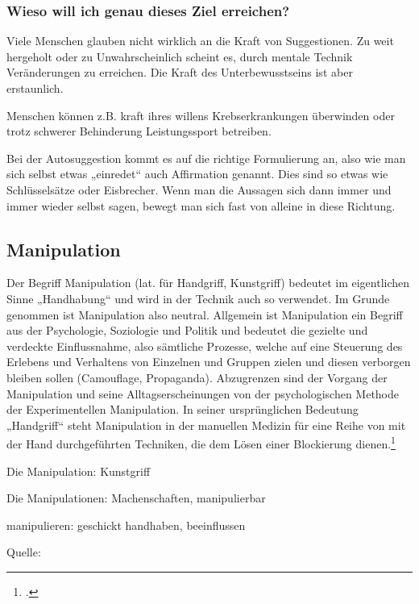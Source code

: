 \subsubsection{Wieso will ich genau dieses Ziel erreichen?}

Viele Menschen glauben nicht wirklich an die Kraft von Suggestionen. Zu weit hergeholt oder zu
Unwahrscheinlich scheint es, durch mentale Technik Veränderungen zu erreichen. Die Kraft des
Unterbewusstseins ist aber erstaunlich.

Menschen können z.B. kraft ihres willens Krebserkrankungen überwinden oder trotz schwerer Behinderung
Leistungssport betreiben.

Bei der Autosuggestion kommt es auf die richtige Formulierung an, also wie man sich selbst etwas
„einredet“ auch Affirmation genannt. Dies sind so etwas wie Schlüsselsätze oder Eisbrecher. Wenn man
die Aussagen sich dann immer und immer wieder selbst sagen, bewegt man sich fast von alleine in diese
Richtung.


\subsection{Manipulation}
Der Begriff Manipulation (lat. für Handgriff, Kunstgriff) bedeutet im eigentlichen Sinne „Handhabung“
und wird in der Technik auch so verwendet. Im Grunde genommen ist Manipulation also neutral.
Allgemein ist Manipulation ein Begriff aus der Psychologie, Soziologie und Politik und bedeutet die
gezielte und verdeckte Einflussnahme, also sämtliche Prozesse, welche auf eine Steuerung des Erlebens
und Verhaltens von Einzelnen und Gruppen zielen und diesen verborgen bleiben sollen (Camouflage,
Propaganda). Abzugrenzen sind der Vorgang der Manipulation und seine Alltagserscheinungen von der
psychologischen Methode der Experimentellen Manipulation. In seiner ursprünglichen Bedeutung
„Handgriff“ steht Manipulation in der manuellen Medizin für eine Reihe von mit der Hand
durchgeführten Techniken, die dem Lösen einer Blockierung dienen.\footcite{Wikipedia:Manipulation}


\begin{eqlist}
	\item[Die Manipulation:] Kunstgriff
	\item[Die Manipulationen:] Machenschaften, manipulierbar
	\item[manipulieren:] geschickt handhaben, beeinflussen
\end{eqlist}
Quelle: \cite{Duden:Fremdwoerterbuch}


